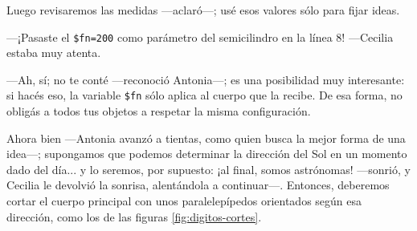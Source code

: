       
    \guillemotright Luego revisaremos las medidas ---aclaró---; usé
    esos valores sólo para fijar ideas.

    ---¡Pasaste el
    \lstinline!$fn=200! como parámetro del semicilindro en la línea 8!
    ---Cecilia estaba muy atenta.%

    ---Ah, sí; no te conté ---reconoció Antonia---; es una posibilidad
    muy interesante: si hacés eso, la variable \lstinline!$fn! sólo
    aplica al cuerpo que la recibe. De esa forma, no obligás a todos
    tus objetos a respetar la misma configuración.

    \guillemotright Ahora bien ---Antonia avanzó a tientas, como quien
    busca la mejor forma de una idea---; supongamos que podemos
    determinar la dirección del Sol en un momento dado del día... y lo
    seremos, por supuesto: ¡al final, somos astrónomas! ---sonrió, y
    Cecilia le devolvió la sonrisa, alentándola a continuar---.
    Entonces, deberemos cortar el cuerpo principal con unos
    paralelepípedos orientados según esa dirección, como los de las
    figuras \ref{fig:digitos-cortes}.

